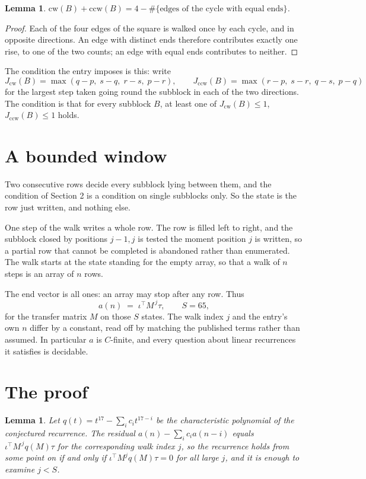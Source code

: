 \documentclass[11pt,a4paper]{article}
\theoremstyle{plain}
\newtheorem{lemma}[theorem]{Lemma}
\theoremstyle{definition}
\begin{document}
\begin{lemma}\label{lem:sum}
$\mathrm{cw}(B)+\mathrm{ccw}(B)=4-\#\{\text{edges of the cycle with equal ends}\}$.
\end{lemma}

\begin{proof}
Each of the four edges of the square is walked once by each cycle, and in opposite directions.
An edge with distinct ends therefore contributes exactly one rise, to one of the two counts;
an edge with equal ends contributes to neither.
\end{proof}

The condition the entry imposes is this: write
\[
J_{\mathrm{cw}}(B)=\max(q-p,\;s-q,\;r-s,\;p-r),\qquad J_{\mathrm{ccw}}(B)=\max(r-p,\;s-r,\;q-s,\;p-q)
\]
for the largest step taken going round the subblock in each of the two directions. The condition is that for every subblock $B$, at least one of $J_{\mathrm{cw}}(B)\le 1$, $J_{\mathrm{ccw}}(B)\le 1$ holds.

\section{A bounded window}

Two consecutive rows decide every subblock lying between them, and the condition of Section 2 is a condition on single subblocks only. So the state is the row just written, and nothing else.

One step of the walk writes a whole row. The row is filled left to right, and the subblock
closed by positions $j-1,j$ is tested the moment position $j$ is written, so a partial row that
cannot be completed is abandoned rather than enumerated. The walk starts at the state standing
for the empty array, so that a walk of $n$ steps is an array of $n$ rows.

The end vector is all ones: an array may stop after any row. Thus
\[
a(n)\;=\;\iota^{\!\top}M^{\,j}\tau ,\qquad S=65,
\]
for the transfer matrix $M$ on those $S$ states. The walk index $j$ and the entry's own $n$
differ by a constant, read off by matching the published terms rather than assumed. In
particular $a$ is $C$-finite, and every question about linear recurrences it satisfies is
decidable.

\section{The proof}

\begin{lemma}\label{lem:crit}
Let $q(t)=t^{17}-\sum_i c_it^{17-i}$ be the characteristic polynomial of the
conjectured recurrence. The residual $a(n)-\sum_ic_ia(n-i)$ equals
$\iota^{\!\top}M^{\,j}q(M)\tau$ for the corresponding walk index $j$, so the recurrence
holds from some point on if and only if $\iota^{\!\top}M^{j}q(M)\tau=0$ for all large $j$,
and it is enough to examine $j<S$.
\end{lemma}
\end{document}
